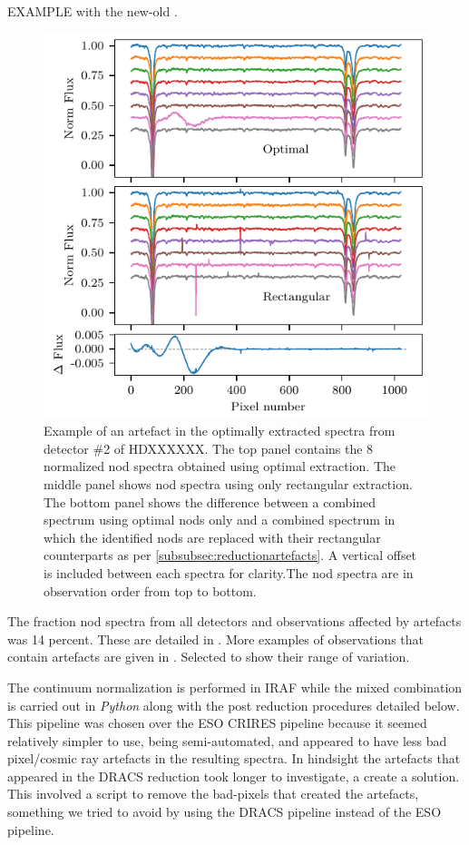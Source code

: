 EXAMPLE with the new-old .
\begin{figure}
    \centering
    \includegraphics[width=\hsize/2]{figures/reduction/Bad_pixel_replacement}
    \caption{Example of an artefact in the optimally extracted spectra from detector \#2 of HDXXXXXX. The top panel contains the 8 normalized nod spectra obtained using optimal extraction. The middle panel shows nod spectra using only rectangular extraction. The bottom panel shows the difference between a combined spectrum using optimal nods only and a combined spectrum in which the identified nods are replaced with their rectangular counterparts as per \ref{subsubsec:reductionartefacts}. A vertical offset is included between each spectra for clarity.The nod spectra are in observation order from top to bottom.}
    \label{fig:badpixelreplacement}
\end{figure}

The fraction nod spectra from all detectors and observations affected by artefacts was 14 percent. These are detailed in . More examples of observations that contain artefacts are given in . Selected to show their range of variation.


The continuum normalization is performed in IRAF while the mixed combination is carried out in \emph{Python} along with the post reduction procedures detailed below. This pipeline was chosen over the ESO CRIRES pipeline because it seemed relatively simpler to use, being semi-automated, and appeared to have less bad pixel/cosmic ray artefacts in the resulting spectra. In hindsight the artefacts that appeared in the DRACS reduction took longer to investigate, a create a solution. This involved a script to remove the bad-pixels that created the artefacts, something we tried to avoid by using the DRACS pipeline instead of the ESO pipeline.

